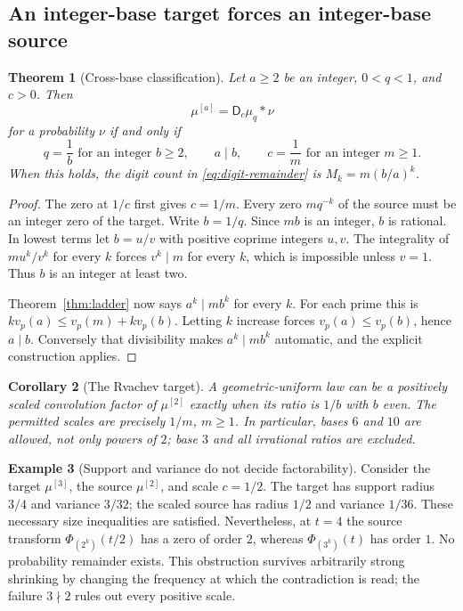 \documentclass[11pt,a4paper]{article}
\newtheorem{theorem}{Theorem}[section]
\newtheorem{corollary}[theorem]{Corollary}
\theoremstyle{definition}
\newtheorem{example}[theorem]{Example}
\theoremstyle{remark}
\newcommand{\D}{\mathsf D}
\newcommand{\Mu}[1]{\mu^{[#1]}}
\begin{document}
\subsection{An integer-base target forces an integer-base source}
\begin{theorem}[Cross-base classification]\label{thm:crossbase}
Let $a\ge2$ be an integer, $0<q<1$, and $c>0$. Then
\begin{equation}\label{eq:crossbase}
 \Mu a=\D_c\mu_q*\nu
\end{equation}
for a probability $\nu$ if and only if
\begin{equation}\label{eq:crossbase-criterion}
 q=\frac1b\text{ for an integer }b\ge2,\qquad a\mid b,\qquad
 c=\frac1m\text{ for an integer }m\ge1.
\end{equation}
When this holds, the digit count in \eqref{eq:digit-remainder} is
$M_k=m(b/a)^k$.
\end{theorem}
\begin{proof}
The zero at $1/c$ first gives $c=1/m$. Every zero $mq^{-k}$ of the source
must be an integer zero of the target. Write $b=1/q$. Since $mb$ is an
integer, $b$ is rational. In lowest terms let $b=u/v$ with positive coprime
integers $u,v$. The integrality of $mu^k/v^k$ for every $k$ forces
$v^k\mid m$ for every $k$, which is impossible unless $v=1$.
Thus $b$ is an integer at least two.

Theorem~\ref{thm:ladder} now says $a^k\mid mb^k$ for every $k$.
For each prime this is
$k v_p(a)\le v_p(m)+k v_p(b)$. Letting $k$ increase forces
$v_p(a)\le v_p(b)$, hence $a\mid b$. Conversely that divisibility makes
$a^k\mid mb^k$ automatic, and the explicit construction applies.
\end{proof}

\begin{corollary}[The Rvachev target]
A geometric-uniform law can be a positively scaled convolution factor of
$\Mu2$ exactly when its ratio is $1/b$ with $b$ even. The permitted scales
are precisely $1/m$, $m\ge1$. In particular, bases $6$ and $10$ are allowed,
not only powers of $2$; base $3$ and all irrational ratios are excluded.
\end{corollary}

\begin{example}[Support and variance do not decide factorability]
Consider the target $\Mu3$, the source $\Mu2$, and scale $c=1/2$.
The target has support radius $3/4$ and variance $3/32$; the scaled source
has radius $1/2$ and variance $1/36$. These necessary size inequalities are
satisfied. Nevertheless, at $t=4$ the source transform $\Phi_{(2^k)}(t/2)$
has a zero of order $2$, whereas $\Phi_{(3^k)}(t)$ has order $1$.
No probability remainder exists. This obstruction survives arbitrarily
strong shrinking by changing the frequency at which the contradiction is
read; the failure $3\nmid2$ rules out every positive scale.
\end{example}
\end{document}
